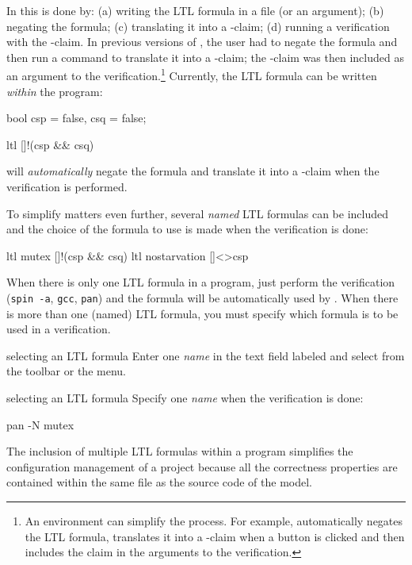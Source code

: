 \documentclass[11pt]{article}
\begin{document}
In \spn{} this is done by: (a) writing the LTL formula in a file (or
an argument); (b) negating the formula; (c) translating it into a
-claim; (d) running a verification with the -claim. In
previous versions of \spn{}, the user had to negate the formula and then
run a command to translate it into a -claim; the
-claim was then included as an argument to the
verification.\footnote{An environment can simplify the process. For
example, \jspin{} automatically negates the LTL formula, translates it
into a -claim when a button is clicked and then includes the
claim in the arguments to the verification.} Currently, the LTL formula
can be written \emph{within} the \prm{} program:

\begin{frag}
bool csp = false, csq = false;

ltl { []!(csp && csq) }
\end{frag}
\spn{} will \emph{automatically} negate the formula and translate it
into a -claim when the verification is performed.

To simplify matters even further, several \emph{named} LTL formulas can
be included and the choice of the formula to use is made when the
verification is done:

\begin{frag}
ltl mutex { []!(csp && csq) }
ltl nostarvation { []<>csp }
\end{frag}

When there is only one LTL formula in a program, just perform the
verification (\verb+spin -a+, \verb+gcc+, \verb+pan+) and the formula
will be automatically used by \spn{}. When there is more than one
(named) LTL formula, you must specify which formula is to be used in a
verification.

\begin{runj}{selecting an LTL formula}
Enter one \emph{name} in the text field labeled  and
select  from the toolbar or the  menu.
\end{runj}

\begin{runcl}{selecting an LTL formula}
Specify one \emph{name} when the verification is done:
\begin{frag}
pan -N mutex
\end{frag}
\end{runcl}

The inclusion of multiple LTL formulas within a \prm{} program
simplifies the configuration management of a project because all the
correctness properties are contained within the same file as the source
code of the model.
\end{document}
